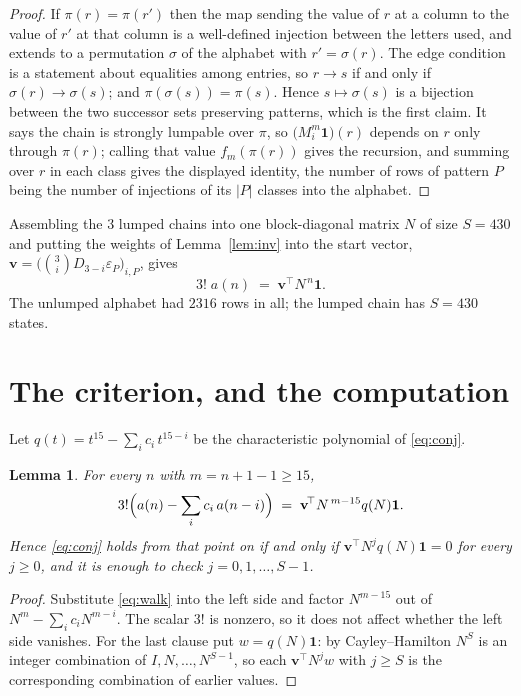 \documentclass[11pt,a4paper]{article}
\theoremstyle{plain}
\newtheorem{lemma}[theorem]{Lemma}
\theoremstyle{definition}
\begin{document}
\begin{proof}
If $\pi(r)=\pi(r')$ then the map sending the value of $r$ at a column to the value of $r'$
at that column is a well-defined injection between the letters used, and extends to a
permutation $\sigma$ of the alphabet with $r'=\sigma(r)$. The edge condition is a statement
about equalities among entries, so $r\to s$ if and only if $\sigma(r)\to\sigma(s)$; and
$\pi(\sigma(s))=\pi(s)$. Hence $s\mapsto\sigma(s)$ is a bijection between the two successor
sets preserving patterns, which is the first claim. It says the chain is strongly lumpable
over $\pi$, so $\bigl(M_i^{m}\mathbf{1}\bigr)(r)$ depends on $r$ only through $\pi(r)$;
calling that value $f_m(\pi(r))$ gives the recursion, and summing over $r$ in each class
gives the displayed identity, the number of rows of pattern $P$ being the number of
injections of its $|P|$ classes into the alphabet.
\end{proof}

Assembling the $3$ lumped chains into one block-diagonal matrix $N$ of size $S=430$ and
putting the weights of Lemma~\ref{lem:inv} into the start vector,
$\mathbf{v}=\bigl(\binom{3}{i}D_{3-i}\varepsilon_P\bigr)_{i,P}$, gives
\begin{equation}\label{eq:walk}
3!\;a(n)\;=\;\mathbf{v}^{\!\top}N^{\,n}\mathbf{1} .
\end{equation}
The unlumped alphabet had $2316$ rows in all; the lumped chain has $S=430$ states.

\section{The criterion, and the computation}

Let $q(t)=t^{15}-\sum_i c_i\,t^{15-i}$ be the characteristic polynomial of
\eqref{eq:conj}.

\begin{lemma}\label{lem:crit}
For every $n$ with $m=n+1-1\ge15$,
\[
3!\Bigl(a(n)-\sum_i c_i\,a(n-i)\Bigr)\;=\;\mathbf{v}^{\!\top}N^{\,m-15}q(N)\mathbf{1} .
\]
Hence \eqref{eq:conj} holds from that point on if and only if
$\mathbf{v}^{\!\top}N^{j}q(N)\mathbf{1}=0$ for every $j\ge0$, and it is enough to check
$j=0,1,\dots,S-1$.
\end{lemma}

\begin{proof}
Substitute \eqref{eq:walk} into the left side and factor $N^{m-15}$ out of
$N^{m}-\sum_i c_iN^{m-i}$. The scalar $3!$ is nonzero, so it does not affect whether
the left side vanishes. For the last clause put $w=q(N)\mathbf{1}$: by Cayley--Hamilton
$N^{S}$ is an integer combination of $I,N,\dots,N^{S-1}$, so each
$\mathbf{v}^{\!\top}N^{j}w$ with $j\ge S$ is the corresponding combination of earlier
values.
\end{proof}
\end{document}
